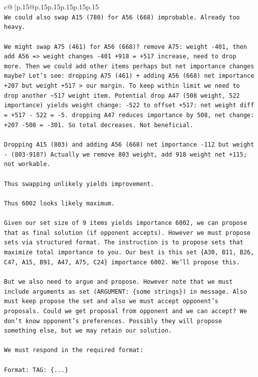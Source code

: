 \documentclass{article}
\begin{document}
{\begin{supertabular}{c@{$\;$}|p{.15\linewidth}@{}p{.15\linewidth}p{.15\linewidth}p{.15\linewidth}p{.15\linewidth}p{.15\linewidth}}
{{{\\ 
\texttt{We could also swap A15 (780) for A56 (668) improbable. Already too heavy.} \\
\\ 
\texttt{We might swap A75 (461) for A56 (668)? remove A75: weight {-}401, then add A56 => weight changes {-}401 +918 = +517 increase, need to drop more. Then we could add other items perhaps but net importance changes maybe? Let's see: dropping A75 (461) + adding A56 (668) net importance +207 but weight +517 > our margin. To keep within limit we need to drop another \textasciitilde{}517 weight item. Potential drop A47 (508 weight, 522 importance) yields weight change: {-}522 to offset +517: net weight diff = +517 {-} 522 = {-}5. dropping A47 reduces importance by 508, net change: +207 {-}508 = {-}301. So total decreases. Not beneficial.} \\
\\ 
\texttt{Dropping A15 (803) and adding A56 (668) net importance {-}112 but weight {-} (803{-}918?) Actually we remove 803 weight, add 918 weight net +115; not workable.} \\
\\ 
\texttt{Thus swapping unlikely yields improvement.} \\
\\ 
\texttt{Thus 6002 looks likely maximum.} \\
\\ 
\texttt{Given our set size of 9 items yields importance 6002, we can propose that as final solution (if opponent accepts). However we must propose sets via structured format. The instruction is to propose sets that maximize total importance to you. Our best is this set \{A30, B11, B26, C47, A15, B91, A47, A75, C24\} importance 6002. We'll propose this.} \\
\\ 
\texttt{But we also need to argue and propose. However note that we must include arguments as set (ARGUMENT: \{some strings\}) in message. Also must keep propose the set and also we must accept opponent's proposals. Could we get proposal from opponent and we can accept? We don't know opponent's preferences. Possibly they will propose something else, but we may retain our solution.} \\
\\ 
\texttt{We must respond in the required format:} \\
\\ 
\texttt{Format: TAG: \{...\}} \\
\\ 
}}}
\end{supertabular}}
\end{document}
